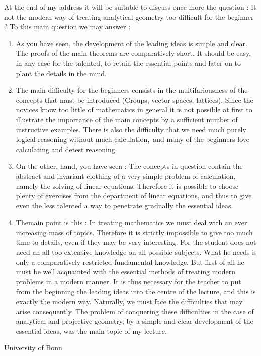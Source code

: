 At the end of my address it will be suitable to discuss once more the
question : It not the modern way of treating analytical geometry too
difficult for the beginner ? To this main question we may answer :
\begin{enumerate}
\item As you have seen, the development of the leading ideas is simple
  and clear. The proofs of the main theorems are comparatively
  short. It should be easy, in any case for the talented, to retain
  the essential points and later on to plant the details in the mind.

\item The main difficulty for the beginners consists in the
  multifariousness of the concepts that must be introduced (Groups,
  vector spaces, lattices). Since the novices know too little of
  mathematics in general it is not possible at first to illustrate the
  importance of the main concepts by a sufficient number of
  instructive examples. There is also the difficulty that we need much
  purely logical reasoning without much calculation,--and many of the
  beginners love calculating and detest reasoning.

\item On the other, hand, you have seen : The concepts in question
  contain the abstract and invariant clothing of a very simple problem
  of calculation, namely the solving of linear equations. Therefore it
  is possible to choose plenty of exercises from the department of
  linear equations, and thus to give even the less talented a way to
  penetrate gradually the essential ideas.

\item The\pageoriginale main point is this : In treating mathematics we must deal
  with an ever increasing mass of topics. Therefore it is strictly
  impossible to give too much time to details, even if they may be
  very interesting. For the student does not need an all too extensive
  knowledge on all possible subjects. What he needs is only a
  comparatively restricted fundamental knowledge. But first of all he
  must be well acquainted with the essential methods of treating
  modern problems in a modern manner. It is thus necessary for the
  teacher to put from the beginning the leading ideas into the centre
  of the lecture, and this is exactly the modern way. Naturally, we
  must face the difficulties that may arise consequently. The problem
  of conquering these difficulties in the case of analytical and
  projective geometry, by a simple and clear development of the
  essential ideas, was the main topic of my lecture.
\end{enumerate}


\bigskip
\bigskip

{\fontsize{9pt}{11pt}\selectfont
University of Bonn}\relax

